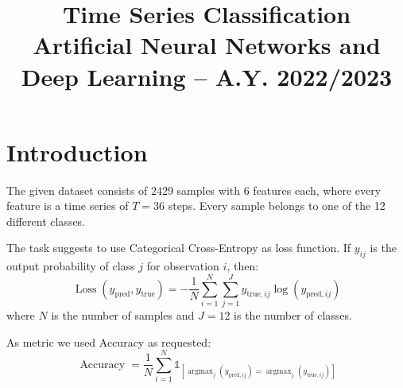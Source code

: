 \documentclass[conference,compsoc,11pt]{IEEEtran}
\begin{document}
\title{Time Series Classification
\\ \large Artificial Neural Networks and Deep Learning -- A.Y. 2022/2023}

\author{
}
\maketitle


\IEEEpeerreviewmaketitle

\section{Introduction}
The given dataset consists of $2429$ samples with $6$ features each, where every feature is a time series of $T = 36$ steps. Every sample belongs to one of the 12 different classes.

The task suggests to use Categorical Cross-Entropy as loss function. If $y_{ij}$ is the output probability of class $j$ for observation $i$, then:
\begin{equation*}
\operatorname{Loss}(y_{\text{pred}},y_{\text{true}}) = - \frac{1}{N} \sum_{i=1}^N \sum_{j=1}^J y_{\text{true},ij} \log(y_{\text{pred},ij})
\end{equation*}
where $N$ is the number of samples and $J = 12$ is the number of classes.

As metric we used Accuracy as requested:
\begin{equation*}
\operatorname{Accuracy} = \frac{1}{N} \sum_{i=1}^N \mathds{1}_{[\operatorname{argmax}_j (y_{\text{pred},ij}) = \operatorname{argmax}_j (y_{\text{true},ij})]}
\end{equation*}
\end{document}
